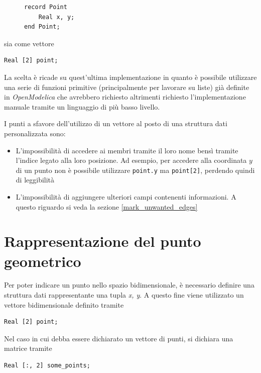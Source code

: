\documentclass[11pt,a4paper]{report}
\begin{document}
\begin{figure}[H]
\begin{lstlisting}[language=Modelica]
record Point
	Real x, y;
end Point;
\end{lstlisting}
\end{figure}

sia come vettore

\begin{lstlisting}[language=Modelica]
Real [2] point;
\end{lstlisting}

La scelta è ricade su quest'ultima implementazione in quanto è possibile utilizzare una serie di funzioni primitive (principalmente per lavorare su liste) già definite in \textit{OpenModelica} che avrebbero richiesto altrimenti richiesto l'implementazione manuale tramite un linguaggio di più basso livello.

I punti a sfavore dell'utilizzo di un vettore al posto di una struttura dati personalizzata sono:

\begin{itemize}
	\item L'impossibilità di accedere ai membri tramite il loro nome bensì tramite l'indice legato alla loro posizione. Ad esempio, per accedere alla coordinata $y$ di un punto non è possibile utilizzare \verb|point.y| ma \verb|point[2]|, perdendo quindi di leggibilità
	\item L'impossibilità di aggiungere ulteriori campi contenenti informazioni. A questo riguardo si veda la sezione \ref{mark_unwanted_edges}
\end{itemize}

\section{Rappresentazione del punto geometrico}

Per poter indicare un punto nello spazio bidimensionale, è necessario definire una struttura dati rappresentante una tupla \textit{x, y}. A questo fine viene utilizzato un vettore bidimensionale definito tramite

\begin{lstlisting}[language=Modelica]
Real [2] point;
\end{lstlisting}

Nel caso in cui debba essere dichiarato un vettore di punti, si dichiara una matrice tramite

\begin{lstlisting}[language=Modelica]
Real [:, 2] some_points;
\end{lstlisting}
\end{document}
